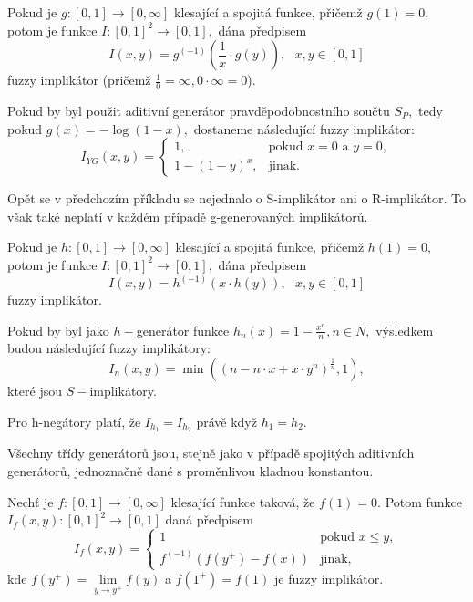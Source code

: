 \begin{sentence}\cite{yager} 
Pokud je $g: [0,1] \to [0,\infty]$ klesající a spojitá funkce,
přičemž $g(1) = 0,$ potom je funkce $I: [0,1]^2 \to [0,1],$ dána předpisem
$$I(x,y) = g^{(-1)}\left (\frac 1x \cdot g(y)\right ), \mbox {   } x, y \in [0,1]$$
fuzzy implikátor (pričemž $\frac{1}{0} = \infty, 0 \cdot \infty = 0$). \\
\end{sentence}
\begin{example}
    \cite{Springer}
    Pokud by byl použit aditivní generátor pravděpodobnostního součtu $S_P,$ tedy 
    pokud $g(x) = - \log (1- x),$ dostaneme následující fuzzy implikátor:
    $$I_{YG}(x,y)= \begin{cases} 1,
    &\mbox {pokud $x=0$ a $y=0,$} \\
    1-(1-y)^x, &\mbox {jinak.}
        \end{cases}$$
\end{example}
\begin{remark}
    Opět se v předchozím příkladu se nejednalo o S-implikátor ani o R-implikátor. To však také neplatí v každém případě g-generovaných implikátor\r u.
\end{remark}

\begin{sentence}\cite{Springer} 
Pokud je $h: [0,1] \to [0,\infty]$ klesající a spojitá funkce,
přičemž $h(1) = 0,$ potom je funkce $I: [0,1]^2 \to [0,1],$ dána předpisem
$$I(x,y) = h^{(-1)}(x \cdot h(y)), \mbox {   } x, y \in [0,1]$$
fuzzy implikátor. \\
\end{sentence}
\begin{example}
    Pokud by byl jako  $h-$generátor funkce $h_n(x) = 1- \frac {x^n}{n}, n
    \in N,$ výsledkem budou následující fuzzy implikátory:
    $$I_n(x,y) = \min \left ( (n - n \cdot x + x \cdot y^n)^{\frac 1n}, 1\right
    ),$$
    kter\'e jsou $S-$implikátory.
\end{example}
\begin{remark}
    Pro h-negátory platí, že $I_{h_1} = I_{h_2}$ právě když $h_1 = h_2.$
\end{remark}

Všechny třídy generátor\r u jsou, stejně jako v případě spojitých aditivních generátor\r u, jednoznačně dané s proměnlivou kladnou konstantou.

\begin{sentence}
\cite{Springer}
    Nech\v t je  $f:[0,1]\rightarrow [0,\infty]$ klesající funkce taková, \v ze $f(1)=0$. 
Potom funkce $I_f(x,y):[0,1]^2\rightarrow [0,1]$ dan\'a předpisem
 $$I_f(x,y)=\begin{cases} 1 & \mbox{pokud $x \leq y$},\\
f^{(-1)}(f(y^+)-f(x)) & \mbox{jinak,} \end{cases}$$
kde $f(y^+)= \lim\limits_{y \to y^+}f(y)$ a $f(1^+)=f(1)$
je fuzzy implik\'ator. \\
\end{sentence}

